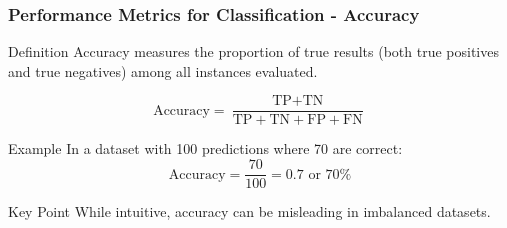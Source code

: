 \documentclass[aspectratio=169]{beamer}
\begin{document}
\begin{frame}[fragile]
    \frametitle{Performance Metrics for Classification - Accuracy}
    \begin{block}{Definition}
        Accuracy measures the proportion of true results (both true positives and true negatives) among all instances evaluated.
    \end{block}
    
    \begin{equation}
    \text{Accuracy} = \frac{\text{TP} + \text{TN}}{\text{TP} + \text{TN} + \text{FP} + \text{FN}}
    \end{equation}
    
    \begin{block}{Example}
        In a dataset with 100 predictions where 70 are correct:
        \begin{equation}
        \text{Accuracy} = \frac{70}{100} = 0.7 \text{ or } 70\%
        \end{equation}
    \end{block}
    
    \begin{alertblock}{Key Point}
        While intuitive, accuracy can be misleading in imbalanced datasets.
    \end{alertblock}
\end{frame}
\end{document}
